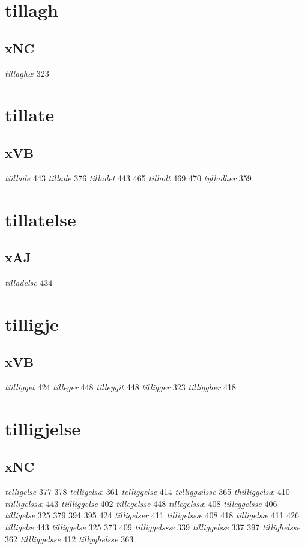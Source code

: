 \documentclass[a4paper,twocolumn]{article}
\begin{document}
\section{tillagh}
\label{sec:orgff6d545}
\subsection{xNC}
\label{sec:org8067997}
\emph{tillaghæ} 323 
\section{tillate}
\label{sec:org420089f}
\subsection{xVB}
\label{sec:org55a8ba4}
\emph{tiillade} 443 \emph{tillade} 376 \emph{tilladet} 443 465 \emph{tilladt} 469 470 \emph{tylladher} 359 
\section{tillatelse}
\label{sec:orgba678f8}
\subsection{xAJ}
\label{sec:orgff46bc5}
\emph{tilladelse} 434 
\section{tilligje}
\label{sec:orgb7b4c86}
\subsection{xVB}
\label{sec:org7d6a185}
\emph{tiilligget} 424 \emph{tilleger} 448 \emph{tilleygit} 448 \emph{tilligger} 323 \emph{tilliggher} 418 
\section{tilligjelse}
\label{sec:orga7bcb13}
\subsection{xNC}
\label{sec:orgc5036a6}
\emph{telligelse} 377 378 \emph{telligelsæ} 361 \emph{telliggelse} 414 \emph{telliggælsse} 365 \emph{thilliggelsæ} 410 \emph{tiilligelssæ} 443 \emph{tiilliggelse} 402 \emph{tillegelsse} 448 \emph{tillegelssæ} 408 \emph{tilleggelsse} 406 \emph{tilligelse} 325 379 394 395 424 \emph{tilligelser} 411 \emph{tilligelssæ} 408 418 \emph{tilligelsæ} 411 426 \emph{tilligelæ} 443 \emph{tilliggelse} 325 373 409 \emph{tilliggelssæ} 339 \emph{tilliggelsæ} 337 397 \emph{tillighelsse} 362 \emph{tillliggelsse} 412 \emph{tillyghelsse} 363 
\end{document}
